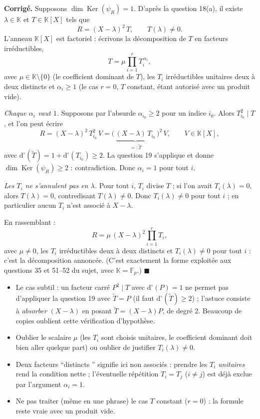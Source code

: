 \documentclass[11pt,a4paper]{article}
\newenvironment{corrige}
  {\par\medskip\noindent
   \begin{tcolorbox}[blanker, breakable,
     borderline west={2.5pt}{0pt}{vertP},
     left=10pt, top=2pt, bottom=2pt]
   {\color{vertP}\bfseries Corrigé.}\hspace{0.5em}\ignorespaces}
  {\hfill$\blacksquare$\end{tcolorbox}\medskip}
\newcommand{\og}{``}
\newcommand{\fg}{''}
\newcommand{\K}{\mathbb{K}}
\newcommand{\Fp}{\mathbb{F}_p}
\newcommand{\dg}[1]{\mathrm{d}^{\circ}\!\left(#1\right)}
\DeclareMathOperator{\Ker}{Ker}
\begin{document}
\begin{corrige}
Supposons $\dim\Ker(\psi_R)=1$. D'après la question 18(a), il existe
$\lambda\in\K$ et $T\in\K[X]$ tels que
\[
R=(X-\lambda)^{2}\,T,\qquad T(\lambda)\neq 0 .
\]
L'anneau $\K[X]$ est factoriel : écrivons la décomposition de $T$ en
facteurs irréductibles,
\[
T=\mu\prod_{i=1}^{r}T_i^{\,\alpha_i},
\]
avec $\mu\in\K\setminus\{0\}$ (le coefficient dominant de $T$), les
$T_i$ irréductibles unitaires deux à deux distincts et
$\alpha_i\ge 1$ (le cas $r=0$, $T$ constant, étant autorisé avec un
produit vide).

\emph{Chaque $\alpha_i$ vaut $1$.} Supposons par l'absurde
$\alpha_{i_0}\ge 2$ pour un indice $i_0$. Alors
$T_{i_0}^{2}\mid T$, et l'on peut écrire
\[
R=(X-\lambda)^{2}\,T_{i_0}^{2}\,V
=\big(\,\underbrace{(X-\lambda)\,T_{i_0}}_{=:\widetilde T}\,\big)^{2}
\,V,\qquad V\in\K[X],
\]
avec $\dg{\widetilde T}=1+\dg{T_{i_0}}\ge 2$. La question 19
s'applique et donne $\dim\Ker(\psi_R)\ge 2$ : contradiction. Donc
$\alpha_i=1$ pour tout $i$.

\emph{Les $T_i$ ne s'annulent pas en $\lambda$.} Pour tout $i$,
$T_i$ divise $T$ ; si l'on avait $T_i(\lambda)=0$, alors
$T(\lambda)=0$, contredisant $T(\lambda)\neq 0$. Donc
$T_i(\lambda)\neq 0$ pour tout $i$ ; en particulier aucun $T_i$
n'est associé à $X-\lambda$.

En rassemblant :
\[
R=\mu\,(X-\lambda)^{2}\prod_{i=1}^{r}T_i,
\]
avec $\mu\neq 0$, les $T_i$ irréductibles deux à deux distincts et
$T_i(\lambda)\neq 0$ pour tout $i$ : c'est la décomposition
annoncée. (C'est exactement la forme exploitée aux questions 35 et
51--52 du sujet, avec $\K=\Fp$.)
\end{corrige}

\begin{pieges}
\begin{itemize}[leftmargin=1.4em, itemsep=2pt]
\item Le cas subtil : un facteur carré $P^{2}\mid T$ avec $\dg{P}=1$
ne permet pas d'appliquer la question 19 avec $\widetilde T=P$
(il faut $\dg{\widetilde T}\ge 2$) ; l'astuce consiste à
\emph{absorber} $(X-\lambda)$ en posant
$\widetilde T=(X-\lambda)P$, de degré $2$. Beaucoup de copies
oublient cette vérification d'hypothèse.
\item Oublier le scalaire $\mu$ (les $T_i$ sont choisis unitaires, le
coefficient dominant doit bien aller quelque part) ou oublier de
justifier $T_i(\lambda)\neq 0$.
\item Deux facteurs \og distincts \fg{} signifie ici non associés :
prendre les $T_i$ \emph{unitaires} rend la condition nette ;
l'éventuelle répétition $T_i=T_j$ ($i\neq j$) est déjà exclue par
l'argument $\alpha_i=1$.
\item Ne pas traiter (même en une phrase) le cas $T$ constant
($r=0$) : la formule reste vraie avec un produit vide.
\end{itemize}
\end{pieges}
\end{document}
